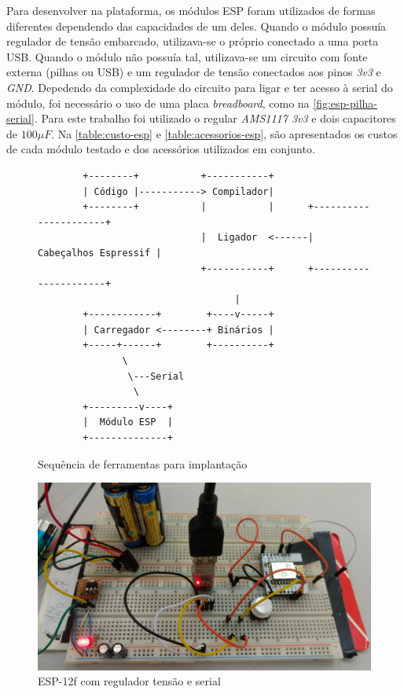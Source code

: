 Para desenvolver na plataforma, os módulos ESP foram utilizados de formas
diferentes dependendo das capacidades de um deles. Quando o módulo possuía
regulador de tensão embarcado, utilizava-se o próprio conectado a uma porta USB.
Quando o módulo não possuía tal, utilizava-se um circuito com fonte externa
(pilhas ou USB) e um regulador de tensão conectados aos pinos \emph{3v3} e
\emph{GND}. Depedendo da complexidade do circuito para ligar e ter acesso à
serial do módulo, foi necessário o uso de uma placa \emph{breadboard}, como na
\autoref{fig:esp-pilha-serial}. Para este trabalho foi utilizado o regular
\emph{AMS1117 3v3} e dois capacitores de $100 \mu F$. Na
\autoref{table:custo-esp} e \autoref{table:acessorios-esp}, são apresentados os
custos de cada módulo testado e dos acessórios utilizados em conjunto.

\begin{figure}[htb]
	\caption{\label{fig:esp-toolchain}Sequência de ferramentas para implantação}
	\begin{center}
		\begin{verbatim}
		+--------+           +-----------+
		| Código |-----------> Compilador|
		+--------+           |           |      +----------------------+
		                     |  Ligador  <------| Cabeçalhos Espressif |
		                     +-----------+      +----------------------+
		                           |
		+------------+        +----v-----+
		| Carregador <--------+ Binários |
		+-----+------+        +----------+
		       \
		        \---Serial
		         \
		+---------v----+
		|  Módulo ESP  |
		+--------------+
		\end{verbatim}
	\end{center}
\end{figure}

\begin{figure}[htb]
	\caption{\label{fig:esp-pilha-serial}ESP-12f com regulador tensão e serial}
	\begin{center}
		\includegraphics[width=1\textwidth]{040-plataformas/esp-dev/breadboard.jpg}
	\end{center}
	\legend{Fonte: Elaborada pelo autor}
\end{figure}


